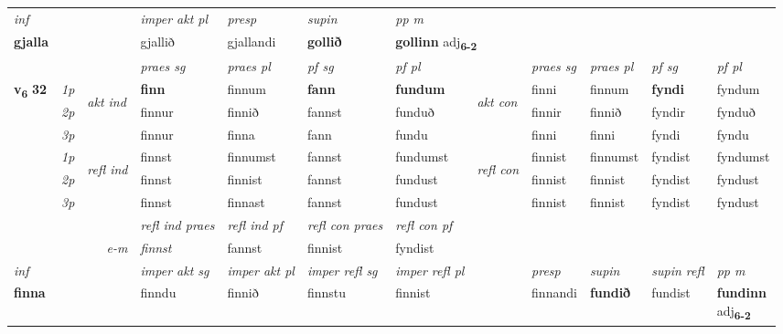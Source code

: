 \begin{longtable}[l]{X>{\footnotesize\itshape}llXXXXlXXXX}
   {\textit{inf}} & &  & \textit{imper akt pl}   & \textit{presp} & \textit{supin}  & \textit{pp m} \\*
  {\textbf{gjalla}} & &  & gjallið   & gjallandi &  \textbf{gollið}  & \multicolumn{2}{l}{\textbf{gollinn} adj\textbf{\textsubscript{6-2}}} \\*

\midrule

 & &   & \textit{praes sg}  & \textit{praes pl}    & \textit{ pf sg} & \textit{pf pl} & & \textit{praes sg}  & \textit{praes pl}    & \textit{pf sg} & \textit{pf pl }  \\ \cmidrule{4-7} \cmidrule{9-12}
 \multirow{2}{*}{{{\textbf{v{\textsubscript{6}}} \Large{\textbf{32}}}}}  & 1p & \multirow{3}{*}{\begin{turn}{90}\textit{akt ind}\end{turn}} & \textbf{finn} & finnum & \textbf{fann} & \textbf{fundum} & \multirow{3}{*}{\begin{turn}{90}\textit{akt con}\end{turn}} &finni & finnum & \textbf{fyndi} & fyndum\\*
 & 2p &  &  finnur  & finnið & fannst & funduð & & finnir & finnið & fyndir & fynduð \\*
 & 3p &  & finnur & finna & fann & fundu & & finni & finni& fyndi & fyndu \\*
\cmidrule{4-7} \cmidrule{9-12}
 & 1p & \multirow{3}{*}{\begin{turn}{90}\textit{refl ind}\end{turn}}  & finnst & finnumst & fannst & fundumst & \multirow{3}{*}{\begin{turn}{90}\textit{refl con}\end{turn}}  &finnist & finnumst & fyndist & fyndumst \\*
 & 2p &  & finnst & finnist & fannst & fundust & &finnist & finnist & fyndist & fyndust \\*
 & 3p  & & finnst & finnast & fannst & fundust & & finnist & finnist& fyndist & fyndust \\*
\cmidrule{4-7} \cmidrule{9-12}

 & && \textit{refl ind praes} & \textit{refl ind pf} & \textit{refl con praes} & \textit{refl con pf} \\*
\multicolumn{3}{r}{\textit{e-m}}& finnst & fannst & finnist & fyndist \\*

\cmidrule{4-7}
   {\textit{inf}} & &  & \textit{imper akt sg} & \textit{imper akt pl} & \textit{imper refl sg} & \textit{imper refl pl} && \textit{presp} & \textit{supin} & \textit{supin refl} & \textit{pp m} \\*
  {\textbf{finna}} & && finndu  & finnið & finnstu & finnist && finnandi &  \textbf{fundið} & fundist & \specialcell{\textbf{fundinn} \\ adj\textbf{\textsubscript{6-2}}} \\*


\end{longtable}
